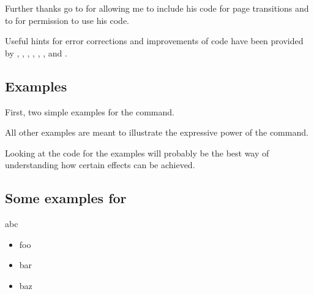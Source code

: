 \begin{slide}
  Further thanks go to \href{mailto:dongen@cs.ucc.ie}{} for allowing me to include his code for
  page transitions and to \href{mailto:Martin.Schroeder@ACM.org}{} for permission to use his
   code.

  Useful hints for error corrections and improvements of code have been provided by ,
  , , , , , and
  .

  \newslide

  \tableofcontents
\end{slide}
\begin{slide}
  \section{Examples}\label{Sec:Ex}
  First, two simple examples for the  command.

  All other examples are meant to illustrate the expressive power of the  command.

  Looking at the code for the examples will probably be the best way of understanding how certain effects can be
  achieved.

  \newslide

  \subsection{Some examples for }
  \begin{center}
    a\pause b\pause c
  \end{center}

  \pause

  \pageTransitionDissolve
  \begin{itemize}
  \item foo\pause
  \item bar\pause
  \item baz
  \end{itemize}


\end{slide}
